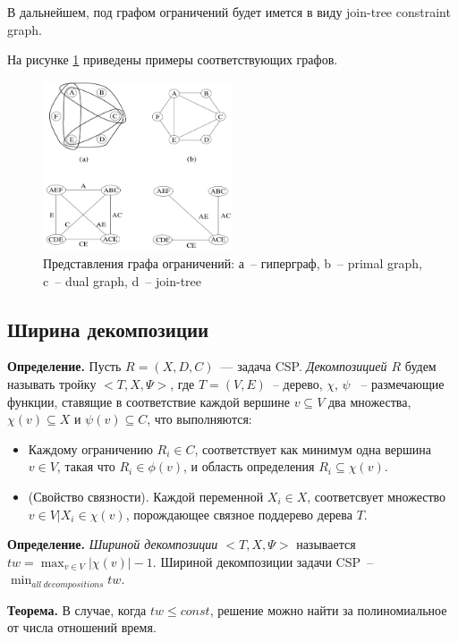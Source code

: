 \documentclass[12pt]{article}
\begin{document}
В дальнейшем, под графом ограничений будет имется в виду join-tree constraint graph.

На рисунке \ref{fig:constraint_graph} приведены примеры соответствующих графов.

\begin{figure}[htb]
\centering
\includegraphics[width=0.50\textwidth]{constraint_graph.png}
\caption{Представления графа ограничений: а~-- гиперграф, b~-- primal graph, c~-- dual graph, d~-- join-tree }
\label{fig:constraint_graph}
\end{figure}


\subsection{Ширина декомпозиции}
\textbf{Определение.} Пусть $R = (X, D, C)$~--- задача CSP. \textit{Декомпозицией $R$} 
будем называть тройку $< T, X, \Psi >$, где $T = (V, E)$~-- дерево, $\chi$, $\psi$ ~-- 
размечающие функции, ставящие в соответствие каждой вершине $v \subseteq V$ два множества, $\chi(v) \subseteq X$
и $\psi(v) \subseteq C$, что выполняются:
\begin{itemize}
\item Каждому ограничению $R_i \in C$, соответствует как минимум одна вершина $v \in V$,
такая что $R_i \in \phi(v)$, и область определения $R_i \subseteq \chi(v)$.
\item (Свойство связности). 
Каждой переменной $X_i \in X$, соответсвует множество ${v \in V |X_i \in \chi(v)}$, порождающее
связное поддерево дерева $T$. 
\end{itemize}

\textbf{Определение.}
\textit{Шириной декомпозиции $ < T, X, \Psi >$} называется $tw = \max_{v \in V}{|\chi(v)| - 1}$.
Шириной декомпозиции задачи CSP~-- $\min_{all~decompositions}{tw}$.


\textbf{Теорема.} В случае, когда $tw \leq const$, 
решение можно найти за полиномиальное от числа отношений время. \cite{CSP10}
\end{document}
